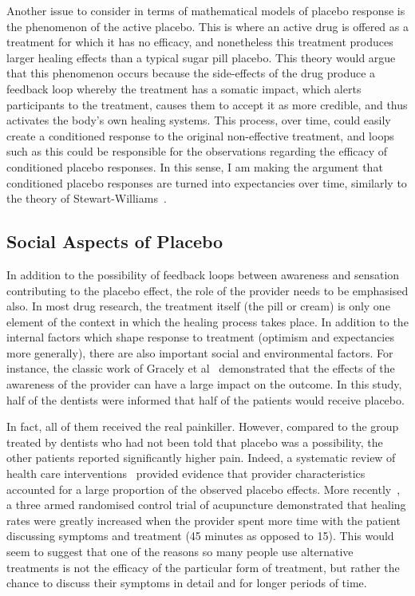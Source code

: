 Another issue to consider in terms of mathematical models of placebo response is the phenomenon of the active placebo. This is where an active drug is offered as a treatment for which it has no efficacy, and nonetheless this treatment produces larger healing effects than a typical sugar pill placebo. This theory would argue that this phenomenon occurs because the side-effects of the drug produce  a feedback loop whereby the treatment has a somatic impact, which alerts participants to the treatment, causes them to accept it as more credible, and thus activates the body's own healing systems. This process, over time, could easily create a conditioned response to the original non-effective treatment, and loops such as this could be responsible for the observations regarding the efficacy of conditioned placebo responses. In this sense, I am making the argument that conditioned placebo responses are turned into expectancies over time, similarly to the theory of Stewart-Williams~\cite{Stewart-Williams2004a}.


\subsection{Social Aspects of Placebo}

In addition to the possibility of feedback loops between awareness and sensation contributing to the placebo effect, the role of the provider needs to be emphasised also. In most drug research, the treatment itself (the pill or cream) is only one element of the context in which the healing process takes place. In addition to the internal factors which shape response to treatment (optimism and expectancies more generally), there are also important social and environmental factors. For instance, the classic work of Gracely et al~\cite{Gracely1985} demonstrated that the effects of the awareness of the provider can have a large impact on the outcome. In this study, half of the dentists were informed that half of the patients would receive placebo. 

In fact, all of them received the real painkiller. However, compared to the group treated by dentists who had not been told that placebo was a possibility, the other patients reported significantly higher pain. Indeed, a systematic review of health care interventions~\cite{DiBlasi2001} provided evidence that provider characteristics accounted for a large proportion of the observed placebo effects. More recently~\cite{Kaptchuk2008}, a three armed randomised control trial of acupuncture demonstrated that healing rates were greatly increased when the provider spent more time with the patient discussing symptoms and treatment (45 minutes as opposed to 15). This would seem to suggest that one of the reasons so many people use alternative treatments is not the efficacy of the particular form of treatment, but rather the chance to discuss their symptoms in detail and for longer periods of time.

